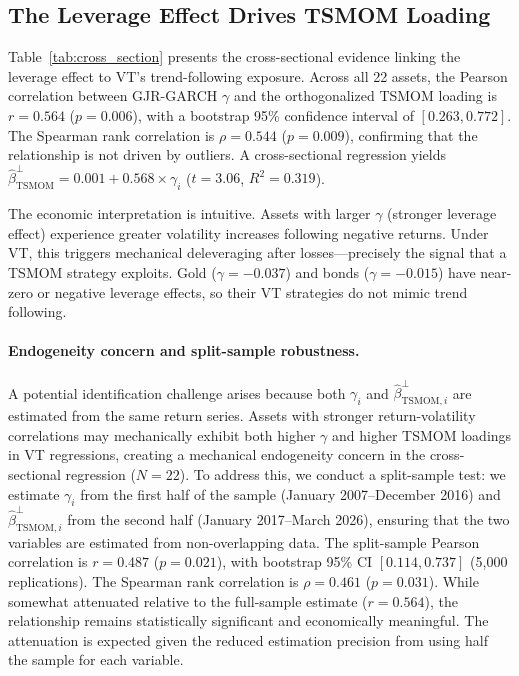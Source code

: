 \subsection{The Leverage Effect Drives TSMOM Loading}

Table~\ref{tab:cross_section} presents the cross-sectional evidence linking the leverage effect to VT's trend-following exposure. Across all 22 assets, the Pearson correlation between GJR-GARCH $\gamma$ and the orthogonalized TSMOM loading is $r = 0.564$ ($p = 0.006$), with a bootstrap 95\% confidence interval of $[0.263, 0.772]$. The Spearman rank correlation is $\rho = 0.544$ ($p = 0.009$), confirming that the relationship is not driven by outliers. A cross-sectional regression yields $\hat{\beta}_{\text{TSMOM}}^{\perp} = 0.001 + 0.568 \times \gamma_i$ ($t = 3.06$, $R^2 = 0.319$).

The economic interpretation is intuitive. Assets with larger $\gamma$ (stronger leverage effect) experience greater volatility increases following negative returns. Under VT, this triggers mechanical deleveraging after losses---precisely the signal that a TSMOM strategy exploits. Gold ($\gamma = -0.037$) and bonds ($\gamma = -0.015$) have near-zero or negative leverage effects, so their VT strategies do not mimic trend following.

\paragraph{Endogeneity concern and split-sample robustness.} A potential identification challenge arises because both $\gamma_i$ and $\hat{\beta}_{\text{TSMOM},i}^{\perp}$ are estimated from the same return series. Assets with stronger return-volatility correlations may mechanically exhibit both higher $\gamma$ and higher TSMOM loadings in VT regressions, creating a mechanical endogeneity concern in the cross-sectional regression ($N = 22$). To address this, we conduct a split-sample test: we estimate $\gamma_i$ from the first half of the sample (January 2007--December 2016) and $\hat{\beta}_{\text{TSMOM},i}^{\perp}$ from the second half (January 2017--March 2026), ensuring that the two variables are estimated from non-overlapping data. The split-sample Pearson correlation is $r = 0.487$ ($p = 0.021$), with bootstrap 95\% CI $[0.114, 0.737]$ (5,000 replications). The Spearman rank correlation is $\rho = 0.461$ ($p = 0.031$). While somewhat attenuated relative to the full-sample estimate ($r = 0.564$), the relationship remains statistically significant and economically meaningful. The attenuation is expected given the reduced estimation precision from using half the sample for each variable.

